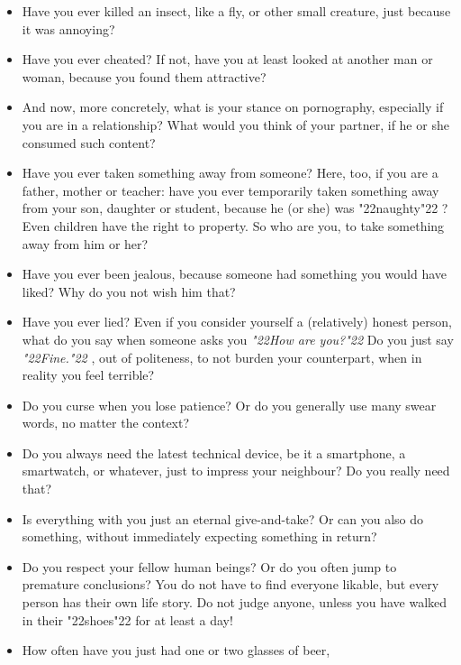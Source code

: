 \documentclass[12pt,a5paper]{article}
\newcommand{\q}[1]{\char"22{#1}\char"22 }
\newcommand{\qq}[1]{\textit{\q{#1}}}
\begin{document}
\begin{itemize}[nosep]
					For example,
					in traffic,
					have you shouted \qq{Idiot} at someone who cut you off?
			\item	Have you ever killed an insect,
					like a fly,
					or other small creature,
					just because it was annoying?
			\item	Have you ever cheated?
					If not,
					have you at least looked at another man or woman,
					because you found them attractive?
			\item	And now,
					more concretely,
					what is your stance on pornography,
					especially if you are in a relationship?
					What would you think of your partner,
					if he or she consumed such content?
			\item	Have you ever taken something away from someone?
					Here,
					too,
					if you are a father,
					mother or teacher:
					have you ever temporarily taken something away from your son,
					daughter or student,
					because he (or she) was \q{naughty}?
					Even children have the right to property.
					So who are you,
					to take something away from him or her?
			\item	Have you ever been jealous,
					because someone had something you would have liked?
					Why do you not wish him that?
			\item	Have you ever lied?
					Even if you consider yourself a (relatively) honest person,
					what do you say when someone asks you
					\qq{How are you?}
					Do you just say \qq{Fine.},
					out of politeness,
					to not burden your counterpart,
					when in reality you feel terrible?
			\item	Do you curse when you lose patience?
					Or do you generally use many swear words,
					no matter the context?
			\item	Do you always need the latest technical device,
					be it a smartphone,
					a smartwatch,
					or whatever,
					just to impress your neighbour?
					Do you really need that?
			\item	Is everything with you just an eternal give-and-take?
					Or can you also do something,
					without immediately expecting something in return?
			\item	Do you respect your fellow human beings?
					Or do you often jump to premature conclusions?
					You do not have to find everyone likable,
					but every person has their own life story.
					Do not judge anyone,
					unless you have walked in their \q{shoes} for at least a day!
			\item	How often have you just had one or two glasses of beer,

\end{itemize}
\end{document}
